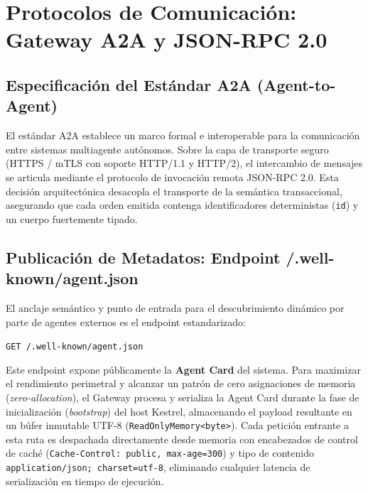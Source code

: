 \section{Protocolos de Comunicación: Gateway A2A y JSON-RPC 2.0}
\label{sec:protocols}

\subsection{Especificación del Estándar A2A (Agent-to-Agent)}
El estándar A2A establece un marco formal e interoperable para la comunicación entre sistemas multiagente autónomos. Sobre la capa de transporte seguro (HTTPS / mTLS con soporte HTTP/1.1 y HTTP/2), el intercambio de mensajes se articula mediante el protocolo de invocación remota JSON-RPC 2.0. Esta decisión arquitectónica desacopla el transporte de la semántica transaccional, asegurando que cada orden emitida contenga identificadores deterministas (\texttt{id}) y un cuerpo fuertemente tipado.

\subsection{Publicación de Metadatos: Endpoint /.well-known/agent.json}
El anclaje semántico y punto de entrada para el descubrimiento dinámico por parte de agentes externos es el endpoint estandarizado:
\begin{center}
    \texttt{GET /.well-known/agent.json}
\end{center}

Este endpoint expone públicamente la \textbf{Agent Card} del sistema. Para maximizar el rendimiento perimetral y alcanzar un patrón de cero asignaciones de memoria (\textit{zero-allocation}), el Gateway procesa y serializa la Agent Card durante la fase de inicialización (\textit{bootstrap}) del host Kestrel, almacenando el payload resultante en un búfer inmutable UTF-8 (\texttt{ReadOnlyMemory<byte>}). Cada petición entrante a esta ruta es despachada directamente desde memoria con encabezados de control de caché (\texttt{Cache-Control: public, max-age=300}) y tipo de contenido \texttt{application/json; charset=utf-8}, eliminando cualquier latencia de serialización en tiempo de ejecución.

